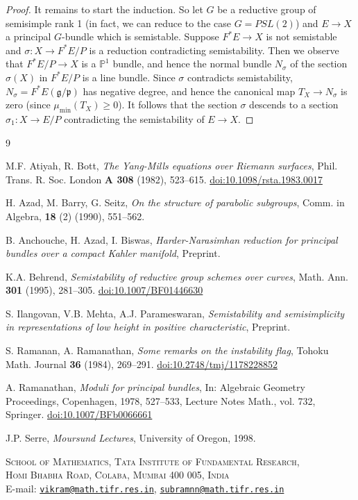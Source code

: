 \documentclass[12pt]{article}
\begin{document}
\begin{proof}
It remains to start the induction. So let $G$ be a reductive group of semisimple rank 1 (in fact, we can reduce to the case $G = PSL(2)$) and $E \to X$ a principal $G$-bundle which is semistable. Suppose $F^*E \to X$ is not semistable and $\sigma : X \to F^*E/P$ is a reduction contradicting semistability. Then we observe that $F^*E/P \to X$ is a $\mathbb{P}^1$ bundle, and hence the normal bundle $N_\sigma$ of the section $\sigma(X)$ in $F^*E/P$ is a line bundle. Since $\sigma$ contradicts semistability, $N_\sigma = F^*E(\mathfrak{g}/\mathfrak{p})$ has negative degree, and hence the canonical map $T_X \to N_\sigma$ is zero (since $\mu_{\min}(T_X) \geq 0$). It follows that the section $\sigma$ descends to a section $\sigma_1 : X \to E/P$ contradicting the semistability of $E \to X$.

\end{proof}

\begin{thebibliography}{9}

M.F. Atiyah, R. Bott, \emph{The Yang-Mills equations over Riemann surfaces}, Phil. Trans. R. Soc. London \textbf{A 308} (1982), 523--615. \href{https://doi.org/10.1098/rsta.1983.0017}{doi:10.1098/rsta.1983.0017}

H. Azad, M. Barry, G. Seitz, \emph{On the structure of parabolic subgroups}, Comm. in Algebra, \textbf{18} (2) (1990), 551--562.

B. Anchouche, H. Azad, I. Biswas, \emph{Harder-Narasimhan reduction for principal bundles over a compact Kahler manifold}, Preprint.

K.A. Behrend, \emph{Semistability of reductive group schemes over curves}, Math. Ann. \textbf{301} (1995), 281--305. \href{https://doi.org/10.1007/BF01446630}{doi:10.1007/BF01446630}

S. Ilangovan, V.B. Mehta, A.J. Parameswaran, \emph{Semistability and semisimplicity in representations of low height in positive characteristic}, Preprint.

S. Ramanan, A. Ramanathan, \emph{Some remarks on the instability flag}, Tohoku Math. Journal \textbf{36} (1984), 269--291. \href{https://doi.org/10.2748/tmj/1178228852}{doi:10.2748/tmj/1178228852}

A. Ramanathan, \emph{Moduli for principal bundles}, In: Algebraic Geometry Proceedings, Copenhagen, 1978, 527--533, Lecture Notes Math., vol. 732, Springer. \href{https://doi.org/10.1007/BFb0066661}{doi:10.1007/BFb0066661}

J.P. Serre, \emph{Moursund Lectures}, University of Oregon, 1998.

\end{thebibliography}

\bigskip
\noindent
\textsc{School of Mathematics, Tata Institute of Fundamental Research,\\
Homi Bhabha Road, Colaba, Mumbai 400 005, India} \\
E-mail: \href{mailto:vikram@math.tifr.res.in}{\texttt{vikram@math.tifr.res.in}}, \href{mailto:subramnn@math.tifr.res.in}{\texttt{subramnn@math.tifr.res.in}}
\end{document}
